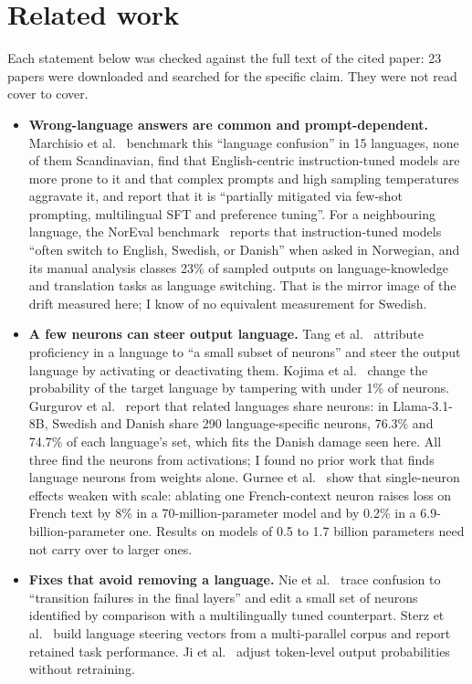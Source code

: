 \documentclass[10pt,a4paper]{article}
\begin{document}
\section{Related work}

Each statement below was checked against the full text of the cited paper: 23 papers were downloaded and searched for the specific claim. They were not read cover to cover.
\begin{itemize}
\item \textbf{Wrong-language answers are common and prompt-dependent.} Marchisio et al.~\cite{marchisio2024} benchmark this ``language confusion'' in 15 languages, none of them Scandinavian, find that English-centric instruction-tuned models are more prone to it and that complex prompts and high sampling temperatures aggravate it, and report that it is ``partially mitigated via few-shot prompting, multilingual SFT and preference tuning''. For a neighbouring language, the NorEval benchmark~\cite{mikhailov2025} reports that instruction-tuned models ``often switch to English, Swedish, or Danish'' when asked in Norwegian, and its manual analysis classes 23\% of sampled outputs on language-knowledge and translation tasks as language switching. That is the mirror image of the drift measured here; I know of no equivalent measurement for Swedish.
\item \textbf{A few neurons can steer output language.} Tang et al.~\cite{tang2024} attribute proficiency in a language to ``a small subset of neurons'' and steer the output language by activating or deactivating them. Kojima et al.~\cite{kojima2024} change the probability of the target language by tampering with under 1\% of neurons. Gurgurov et al.~\cite{gurgurov2025} report that related languages share neurons: in Llama-3.1-8B, Swedish and Danish share 290 language-specific neurons, 76.3\% and 74.7\% of each language's set, which fits the Danish damage seen here. All three find the neurons from activations; I found no prior work that finds language neurons from weights alone. Gurnee et al.~\cite{gurnee2023} show that single-neuron effects weaken with scale: ablating one French-context neuron raises loss on French text by 8\% in a 70-million-parameter model and by 0.2\% in a 6.9-billion-parameter one. Results on models of 0.5 to 1.7 billion parameters need not carry over to larger ones.
\item \textbf{Fixes that avoid removing a language.} Nie et al.~\cite{nie2025} trace confusion to ``transition failures in the final layers'' and edit a small set of neurons identified by comparison with a multilingually tuned counterpart. Sterz et al.~\cite{sterz2025} build language steering vectors from a multi-parallel corpus and report retained task performance. Ji et al.~\cite{ji2025} adjust token-level output probabilities without retraining.

\end{itemize}
\end{document}
